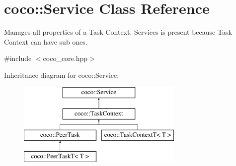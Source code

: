 \hypertarget{classcoco_1_1_service}{}\section{coco\+:\+:Service Class Reference}
\label{classcoco_1_1_service}


Manages all properties of a Task Context. Services is present because Task Context can have sub ones.  




{\ttfamily \#include $<$coco\+\_\+core.\+hpp$>$}

Inheritance diagram for coco\+:\+:Service\+:\begin{figure}[H]
\begin{center}
\leavevmode
\includegraphics[height=4.000000cm]{classcoco_1_1_service}
\end{center}
\end{figure}
